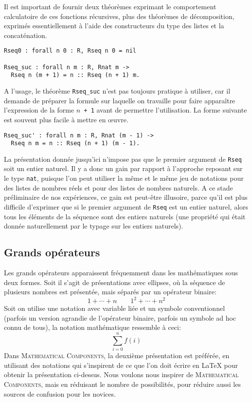 \documentclass{modjflart}
\newcommand{\mathcomp}{\textsc{Mathematical Components}}
\begin{document}
Il est important de fournir deux théorèmes exprimant
le comportement calculatoire de ces fonctions récursives, plus des
théorèmes de décomposition, exprimés essentiellement à l'aide des
constructeurs du type des listes et la concaténation.
\begin{verbatim}
Rseq0 : forall n 0 : R, Rseq n 0 = nil

Rseq_suc : forall n m : R, Rnat m ->
  Rseq n (m + 1) = n :: Rseq (n + 1) m.
\end{verbatim}
A l'usage, le théorème \texttt{Rseq\_suc} n'est pas toujours pratique à
utiliser, car il demande de préparer la formule sur laquelle on
travaille pour faire apparaître l'expression de la forme \texttt{\(n\) +
  1} avant de permettre l'utilisation.  La forme suivante est souvent
plus facile à mettre en œuvre.
\begin{verbatim}
Rseq_suc' : forall n m : R, Rnat (m - 1) ->
  Rseq n m = n :: Rseq (n + 1) (m - 1).
\end{verbatim}
La présentation donnée jusqu'ici n'impose pas que le premier argument
de \texttt{Rseq} soit un entier naturel.  Il y a donc un gain par rapport
à l'approche reposant sur le type \texttt{nat}, puisque l'on peut
utiliser la même et le même jeu de notations pour des listes de
nombres réels et pour des listes de nombres naturels.  A ce stade
préliminaire de nos expériences, ce gain est peut-être illusoire,
parce qu'il est plus difficile d'exprimer que si le premier argument
de \texttt{Rseq} est un entier naturel, alors tous les éléments de la
séquence sont des entiers naturels (une propriété qui était donnée
naturellement par le typage sur les entiers naturels).

\subsection{Grands opérateurs}
Les grands opérateurs apparaissent fréquemment dans les mathématiques
sous deux formes.  Soit il s'agit de présentations avec ellipses, où
la séquence de plusieurs nombres est présentée, mais séparés par un
opérateur binaire:
\[1 + \cdots + n  \qquad 1 ^ 2 + \cdots + n ^ 2 \]
Soit on utilise une notation avec variable liée et un symbole
conventionnel (parfois un version agrandie de l'opérateur binaire,
parfois un symbole ad hoc connu de tous), la notation mathématique
ressemble à ceci:
\[\sum_{i=0}^{n} f(i)\]
Dans \mathcomp{}, la deuxième présentation est préférée, en utilisant
des notations qui s'inspirent de ce que l'on doit écrire en \LaTeX{}
pour obtenir la présentation ci-dessus.  Nous voulons nous inspirer de
\mathcomp{}, mais en réduisant le nombre de possibilités, pour réduire
aussi les sources de confusion pour les novices.
\end{document}
